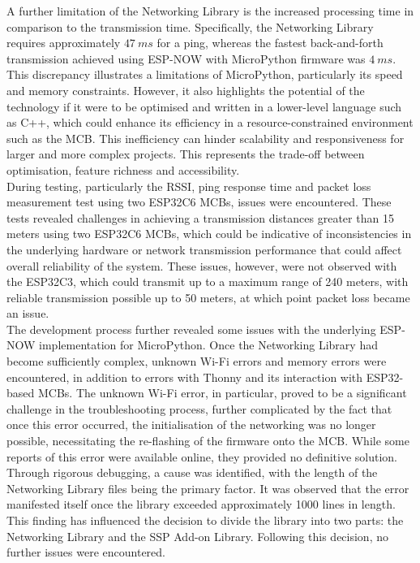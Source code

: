 A further limitation of the Networking Library is the increased processing time in comparison to the transmission time. Specifically, the Networking Library requires approximately $47\ ms$ for a ping, whereas the fastest back-and-forth transmission achieved using ESP-NOW with MicroPython firmware was $4\ ms$. This discrepancy illustrates a limitations of MicroPython, particularly its speed and memory constraints. However, it also highlights the potential of the technology if it were to be optimised and written in a lower-level language such as C++, which could enhance its efficiency in a resource-constrained environment such as the MCB. This inefficiency can hinder scalability and responsiveness for larger and more complex projects. This represents the trade-off between optimisation, feature richness and accessibility.\\

During testing, particularly the RSSI, ping response time and packet loss measurement test using two ESP32C6 MCBs, issues were encountered. These tests revealed challenges in achieving a transmission distances greater than 15 meters using two ESP32C6 MCBs, which could be indicative of  inconsistencies in the underlying hardware or network transmission performance that could affect overall reliability of the system. These issues, however, were not observed with the ESP32C3, which could transmit up to a maximum range of 240 meters, with reliable transmission possible up to 50 meters, at which point packet loss became an issue. \\

The development process further revealed some issues with the underlying ESP-NOW implementation for MicroPython. Once the Networking Library had become sufficiently complex, unknown Wi-Fi errors and memory errors were encountered, in addition to errors with Thonny and its interaction with ESP32-based MCBs. The unknown Wi-Fi error, in particular, proved to be a significant challenge in the troubleshooting process, further complicated by the fact that once this error occurred, the initialisation of the networking was no longer possible, necessitating the re-flashing of the firmware onto the MCB. While some reports of this error were available online, they provided no definitive solution. Through rigorous debugging, a cause was identified, with the length of the Networking Library files being the primary factor. It was observed that the error manifested itself once the library exceeded approximately 1000 lines in length. This finding has influenced the decision to divide the library into two parts: the Networking Library and the SSP Add-on Library. Following this decision, no further issues were encountered.

